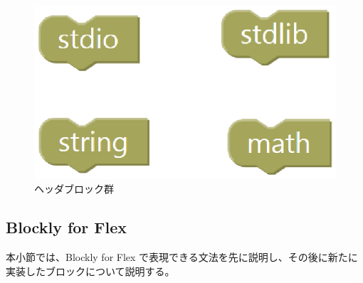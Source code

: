 \documentclass{eniepaper}
\begin{document}
\begin{itemize}
\begin{figure}[h]
\begin{center}
\includegraphics[scale=0.5]{img/header.eps}
\caption{ヘッダブロック群}%
\label{fig:header}
\end{center}%
\end{figure}%

\end{itemize} 
   
   \subsection{Blockly for Flex}

本小節では、Blockly for Flex で表現できる文法を先に説明し、その後に新たに実装したブロックについて説明する。
\end{document}
